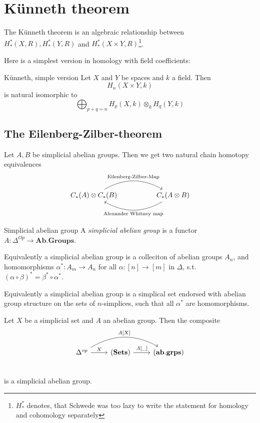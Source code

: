 \documentclass[language=english]{TemplateLecture}
\begin{document}
\chapter{Künneth theorem}
The Künneth theorem is an algebraic relationship between \(H^*_*(X,R), H^*_*(Y,R)\) and \(H^*_*(X\times Y, R)\)\footnote{\(H_*^*\) denotes, that Schwede was too lazy to write the statement for homology and cohomology separately}.

Here is a simplest version in homology with field coefficients:
\begin{thm}{Künneth, simple version}{}
    Let \(X\) and \(Y\) be spaces and \(k\) a field. Then
    \[H_n(X\times Y, k)\]
    is natural isomorphic to
    \[\bigoplus_{p+q = n} H_p(X,k) \otimes_k H_q(Y,k)\]
\end{thm}

\section{The Eilenberg-Zilber-theorem}

Let \(A,B\) be simplicial abelian groups. Then we get two natural chain homotopy equivalences
\[\begin{tikzcd}
    C_*(A) \otimes C_*(B) \ar[rr, bend left, "\text{Eilenberg-Zilber-Map}"] && C_*(A\otimes B) \ar[ll, bend left, "\text{Alexander Whitney map}"]
\end{tikzcd}\]

\begin{defi}{Simplicial abelian group}{}
    A \emph{simplicial abelian group}  is a functor \(A\colon \Delta^{Op} \to \mathbf{Ab.Groups}\).
\end{defi}

\begin{Remark}
    Equivalently a simplicial abelian group is a colleciton of abelian groups \(A_n\), and homomorphisms \(\alpha^*\colon A_m \to A_n\) for all \(\alpha\colon [n] \to [m]\) in \(\Delta\), s.t. \((\alpha\circ \beta)^* = \beta^* \circ \alpha^*\).

    Equivalently a simplicial abelian group is a simplical set endorsed with abelian group structure on the sets of \(n\)-simplices, such that all \(\alpha^*\) are homomorphisms.
\end{Remark}


\begin{example}
    Let \(X\) be a simplicial set and \(A\) an abelian group. Then the composite
    \[\begin{tikzcd}
        \Delta^{op} \ar[rr, bend left, "{A[X]}"]\ar[r, "X"] & (\mathbf{Sets}) \ar[r, "{{A[\_]}}"] & (\mathbf{ab.grps}) \\
    \end{tikzcd}\]
    is a simplicial abelian group.
\end{example}
\end{document}
